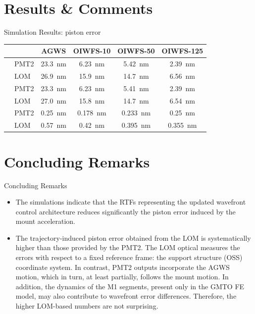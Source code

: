 \documentclass[10pt]{beamer}
\begin{document}
\section{Results \& Comments}
\begin{frame}{Simulation Results: piston error}
  \begin{center}
  \begin{tabular}{l l|cccc}
    & & AGWS & OIWFS-10 & OIWFS-50 & OIWFS-125 \\
   \hline \rowcolor{Gray}
   \multirow{2}{*}{TJ101} & PMT2 & \SI{23.3}{nm} & \SI{6.23}{nm} & \SI{5.42}{nm} & \SI{2.39}{nm} \\
                          & LOM & \SI{26.9}{nm} & \SI{15.9}{nm} & \SI{14.7}{nm} & \SI{6.56}{nm}\\
   \hline \rowcolor{Gray}
   \multirow{2}{*}{TJ102} & PMT2 & \SI{23.3}{nm} & \SI{6.23}{nm} & \SI{5.41}{nm} & \SI{2.39}{nm}\\
                          & LOM & \SI{27.0}{nm} & \SI{15.8}{nm} & \SI{14.7}{nm} & \SI{6.54}{nm}\\
   \hline \rowcolor{Gray} 
   \multirow{2}{*}{TJ103} & PMT2 & \SI{0.25}{nm} & \SI{0.178}{nm} & \SI{0.233}{nm} & \SI{0.25}{nm}\\
                          & LOM & \SI{0.57}{nm} & \SI{0.42}{nm} & \SI{0.395}{nm} & \SI{0.355}{nm}
  \end{tabular}  
  \end{center}
\end{frame}



\section{Concluding Remarks}
\begin{frame}{Concluding Remarks}
\begin{itemize}
  \item The simulations indicate that the RTFs representing the updated wavefront control architecture reduces significantly the piston error induced by the mount acceleration.
  \item The trajectory-induced piston error obtained from the LOM is systematically higher than those provided by the PMT2. The LOM optical measures the errors with respect to a fixed reference frame: the support structure (OSS) coordinate system. In contrast, PMT2 outputs incorporate the AGWS motion, which in turn, at least partially, follows the mount motion. In addition, the dynamics of the M1 segments, present only in the GMTO FE model, may also contribute to wavefront error differences. Therefore, the higher LOM-based numbers are not surprising.
\end{itemize}  
\end{frame}
\end{document}
